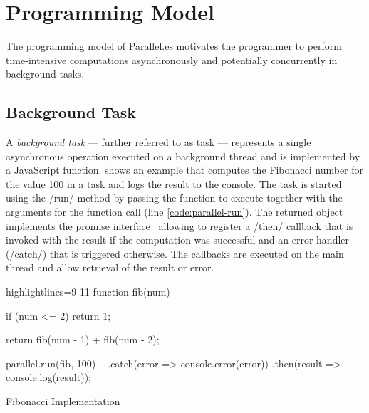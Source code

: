 \section{Programming Model}\label{sec:programming-model}
The programming model of Parallel.es motivates the programmer to perform time-intensive computations asynchronously and potentially concurrently in background tasks. 

\subsection{Background Task}
A \textit{background task} --- further referred to as task --- represents a single asynchronous operation executed on a background thread and is implemented by a JavaScript function.  shows an example that computes the Fibonacci number for the value 100 in a task and logs the result to the console. The task is started using the \javascriptinline/run/ method by passing the function to execute together with the arguments for the function call (line \ref{code:parallel-run}). The returned object implements the promise interface~\cite[Section 18.3.18]{ecmaScript2015} allowing to register a \javascriptinline/then/ callback that is invoked with the result if the computation was successful and an error handler (\javascriptinline/catch/) that is triggered otherwise. The callbacks are executed on the main thread and allow retrieval of the result or error. 


\begin{listing}
	\begin{javascriptcode*}{highlightlines={9-11}}
function fib(num) {
	if (num <= 2) {
    	return 1;
	}

	return fib(num - 1) + fib(num - 2);
}
        
parallel.run(fib, 100) |$\label{code:parallel-run}$|
	.catch(error => console.error(error))
	.then(result => console.log(result));	
	\end{javascriptcode*}

	\caption{Fibonacci Implementation}
	\label{fig:fibonacci-implementation}
\end{listing}


